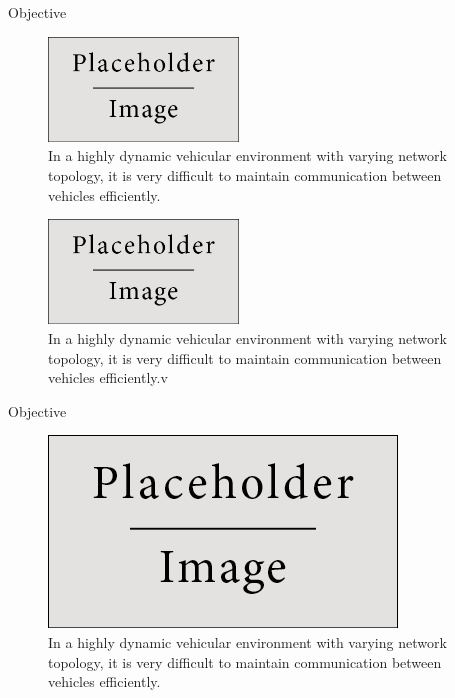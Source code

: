 \documentclass[final]{beamer}
\newlength{\onecolwid}
\begin{document}
\begin{frame}[t]
\begin{columns}[t]
\begin{column}{\onecolwid}
\begin{block}{Objective}
\begin{multicols}{2}

\begin{figure}[!ht]
\centering
\includegraphics[width=0.45\textwidth,keepaspectratio]{placeholder.jpg}
\caption{In a highly dynamic vehicular environment with varying network topology, it is very difficult to maintain communication between vehicles efficiently.}
\end{figure}

\begin{figure}[!ht]
\centering
\includegraphics[width=0.45\textwidth,keepaspectratio]{placeholder.jpg}
\caption{In a highly dynamic vehicular environment with varying network topology, it is very difficult to maintain communication between vehicles efficiently.v}
\end{figure}
\end{multicols}

\end{block}

\begin{alertblock}{Objective}
\begin{figure}
\centering
\includegraphics[width=\textwidth,keepaspectratio]{placeholder.jpg}
\caption{In a highly dynamic vehicular environment with varying network topology, it is very difficult to maintain communication between vehicles efficiently.}
\end{figure}
\end{alertblock}


\end{column}
\end{columns}
\end{frame}
\end{document}
